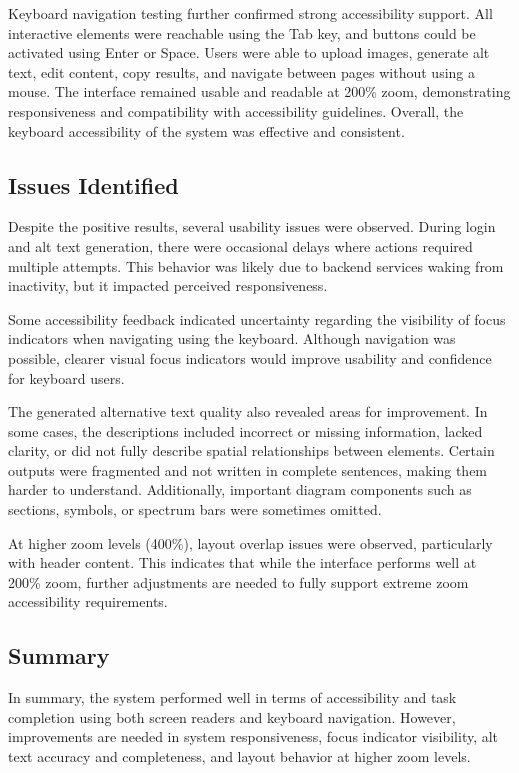 \documentclass{article}
\begin{document}
Keyboard navigation testing further confirmed strong accessibility support. All interactive elements were reachable using the Tab key, and buttons could be activated using Enter or Space. Users were able to upload images, generate alt text, edit content, copy results, and navigate between pages without using a mouse. The interface remained usable and readable at 200\% zoom, demonstrating responsiveness and compatibility with accessibility guidelines. Overall, the keyboard accessibility of the system was effective and consistent.

\subsection{Issues Identified}
Despite the positive results, several usability issues were observed. During login and alt text generation, there were occasional delays where actions required multiple attempts. This behavior was likely due to backend services waking from inactivity, but it impacted perceived responsiveness.

Some accessibility feedback indicated uncertainty regarding the visibility of focus indicators when navigating using the keyboard. Although navigation was possible, clearer visual focus indicators would improve usability and confidence for keyboard users.

The generated alternative text quality also revealed areas for improvement. In some cases, the descriptions included incorrect or missing information, lacked clarity, or did not fully describe spatial relationships between elements. Certain outputs were fragmented and not written in complete sentences, making them harder to understand. Additionally, important diagram components such as sections, symbols, or spectrum bars were sometimes omitted.

At higher zoom levels (400\%), layout overlap issues were observed, particularly with header content. This indicates that while the interface performs well at 200\% zoom, further adjustments are needed to fully support extreme zoom accessibility requirements.

\subsection{Summary}
In summary, the system performed well in terms of accessibility and task completion using both screen readers and keyboard navigation. However, improvements are needed in system responsiveness, focus indicator visibility, alt text accuracy and completeness, and layout behavior at higher zoom levels.
\end{document}
